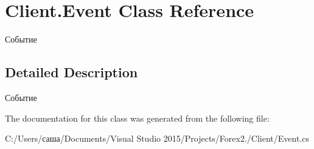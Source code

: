 \hypertarget{class_client_1_1_event}{}\section{Client.\+Event Class Reference}
\label{class_client_1_1_event}


Событие  




\subsection{Detailed Description}
Событие 



The documentation for this class was generated from the following file\+:\begin{DoxyCompactItemize}
\item 
C\+:/\+Users/саша/\+Documents/\+Visual Studio 2015/\+Projects/\+Forex2./\+Client/Event.\+cs\end{DoxyCompactItemize}
